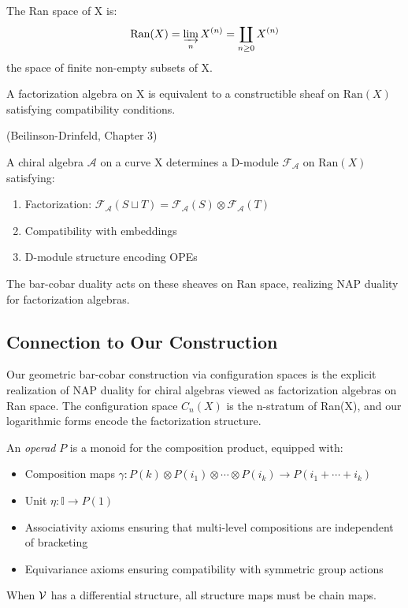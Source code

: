\begin{definition}\label{def:ran-space}
The Ran space of X is:
$$\text{Ran}(X) = \varinjlim_{n} X^{(n)} = \coprod_{n \geq 0} X^{(n)}$$
the space of finite non-empty subsets of X.

A factorization algebra on X is equivalent to a constructible sheaf on $\text{Ran}(X)$ satisfying compatibility conditions.
\end{definition}

\begin{theorem}\label{thm:chiral-ran}
\textup{(Beilinson-Drinfeld, Chapter 3)}

A chiral algebra $\mathcal{A}$ on a curve X determines a D-module $\mathcal{F}_{\mathcal{A}}$ on $\text{Ran}(X)$ satisfying:
\begin{enumerate}
\item Factorization: $\mathcal{F}_{\mathcal{A}}(S \sqcup T) = \mathcal{F}_{\mathcal{A}}(S) \otimes \mathcal{F}_{\mathcal{A}}(T)$
\item Compatibility with embeddings
\item D-module structure encoding OPEs
\end{enumerate}

The bar-cobar duality acts on these sheaves on Ran space, realizing NAP duality for factorization algebras.
\end{theorem}

\subsection{Connection to Our Construction}

Our geometric bar-cobar construction via configuration spaces is the explicit realization of NAP duality for chiral algebras viewed as factorization algebras on Ran space. The configuration space $C_n(X)$ is the n-stratum of Ran(X), and our logarithmic forms encode the factorization structure.

\begin{definition}[Operad]
An \emph{operad} $P$ is a monoid for the composition product, equipped with:
\begin{itemize}
\item Composition maps $\gamma : P(k) \otimes P(i_1) \otimes \cdots \otimes P(i_k) \to P(i_1 + \cdots + i_k)$
\item Unit $\eta : \mathbb{I} \to P(1)$ 
\item Associativity axioms ensuring that multi-level compositions are independent of bracketing
\item Equivariance axioms ensuring compatibility with symmetric group actions
\end{itemize}
When $\mathcal{V}$ has a differential structure, all structure maps must be chain maps.
\end{definition}
 
